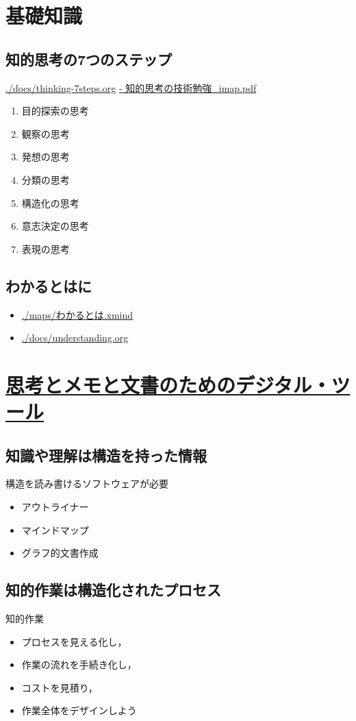 \documentclass[dvipdfmx,11pat]{jarticle}
\begin{document}
\section{基礎知識}
\label{sec:org447466e}

\subsection{知的思考の7つのステップ}
\label{sec:org0921561}
\url{./docs/thinking-7steps.org}
\href{https://masayuki054.github.io/tools\_for\_thinking\_and\_memo/i\_maps/\%E7\%9F\%A5\%E7\%9A\%84\%E6\%80\%9D\%E8\%80\%83\%E3\%81\%AE\%E6\%8A\%80\%E8\%A1\%93\%E5\%8B\%89\%E5\%BC\%B7\_imap.pdf}{- 知的思考の技術勉強\_imap.pdf}
\begin{enumerate}
\item 目的探索の思考
\item 観察の思考
\item 発想の思考
\item 分類の思考
\item 構造化の思考
\item 意志決定の思考
\item 表現の思考
\end{enumerate}
\subsection{わかるとはに}
\label{sec:org505c6b7}

\begin{itemize}
\item \url{./maps/わかるとは.xmind}
\item \url{./docs/understanding.org}
\end{itemize}
\section{\href{./digital\_tools.org}{思考とメモと文書のためのデジタル・ツール}}
\label{sec:org824522f}
\subsection{知識や理解は構造を持った情報}
\label{sec:orgce92dfb}
構造を読み書けるソフトウェアが必要
\begin{itemize}
\item アウトライナー
\item マインドマップ
\item グラフ的文書作成
\end{itemize}
\subsection{知的作業は構造化されたプロセス}
\label{sec:org3675896}
知的作業
\begin{itemize}
\item プロセスを見える化し，
\item 作業の流れを手続き化し，
\item コストを見積り，
\item 作業全体をデザインしよう
\end{itemize}
\end{document}
